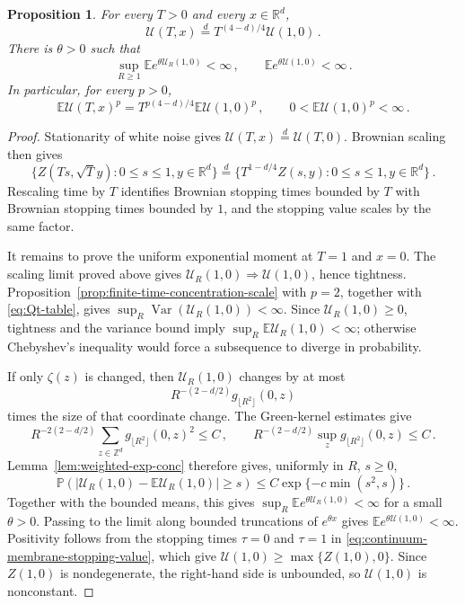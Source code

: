 \documentclass[11pt]{amsart}
\theoremstyle{plain}
\newtheorem{proposition}[theorem]{Proposition}
\theoremstyle{definition}
\newcommand{\Z}{\mathbb{Z}}
\newcommand{\R}{\mathbb{R}}
\newcommand{\E}{\mathbb{E}}
\renewcommand{\P}{\mathbb{P}}
\DeclareMathOperator{\Var}{Var}
\begin{document}
	\begin{proposition}\label{prop:continuum-value-selfsimilar}
		For every $T>0$ and every $x\in\R^d$,
		\[
			\mathcal U(T,x)\stackrel d= T^{(4-d)/4}\mathcal U(1,0)\, .
		\]
			There is $\theta>0$ such that
			\[
				\sup_{R\geq1}\E e^{\theta\mathcal U_R(1,0)}<\infty\, ,
				\qquad
				\E e^{\theta\mathcal U(1,0)}<\infty \, .
			\]
		In particular, for every $p>0$,
		\[
			\E\mathcal U(T,x)^p
			=
			T^{p(4-d)/4}\E\mathcal U(1,0)^p\, ,
			\qquad
			0<\E\mathcal U(1,0)^p<\infty \, .
		\]
	\end{proposition}
	\begin{proof}
		Stationarity of white noise gives
		$\mathcal U(T,x)\stackrel d=\mathcal U(T,0)$. Brownian scaling then gives
		\[
			\{Z(Ts,\sqrt T y):0\leq s\leq1,y\in\R^d\}
			\stackrel d=
			\{T^{1-d/4}Z(s,y):0\leq s\leq1,y\in\R^d\}\, .
		\]
		Rescaling time by $T$ identifies Brownian stopping
		times bounded by $T$ with Brownian stopping times bounded by $1$, and
		the stopping value scales by the same factor.

			It remains to prove the uniform exponential moment at $T=1$ and $x=0$. The
			scaling limit proved above gives
		$\mathcal U_R(1,0)\Longrightarrow\mathcal U(1,0)$, hence tightness.
		Proposition~\ref{prop:finite-time-concentration-scale} with
		$p=2$, together with \eqref{eq:Qt-table}, gives
		$\sup_R\Var(\mathcal U_R(1,0))<\infty$. Since $\mathcal U_R(1,0)\geq0$,
		tightness and the variance bound imply
		$\sup_R\E\mathcal U_R(1,0)<\infty$; otherwise Chebyshev's inequality
		would force a subsequence to diverge in probability.

		If only $\zeta(z)$ is changed, then $\mathcal U_R(1,0)$ changes by at most
		\[
			R^{-(2-d/2)}g_{\lfloor R^2\rfloor}(0,z)
		\]
		times the size of that coordinate change.
		The Green-kernel estimates give
		\[
			R^{-2(2-d/2)}\sum_{z\in\Z^d} g_{\lfloor R^2\rfloor}(0,z)^2\leq C\, ,
			\qquad
			R^{-(2-d/2)}\sup_z g_{\lfloor R^2\rfloor}(0,z)\leq C \, .
		\]
		Lemma~\ref{lem:weighted-exp-conc} therefore gives, uniformly in $R$, $s\geq0$,
		\[
			\P\left(
			|\mathcal U_R(1,0)-\E\mathcal U_R(1,0)|\geq s
			\right)
			\leq C\exp\{-c\min(s^2,s)\} \, .
		\]
		Together with the bounded means, this gives
		$\sup_R\E e^{\theta\mathcal U_R(1,0)}<\infty$ for a small
		$\theta>0$. Passing to the limit along bounded truncations of
		$e^{\theta x}$ gives $\E e^{\theta\mathcal U(1,0)}<\infty$.
		Positivity follows from the stopping times $\tau=0$ and $\tau=1$ in
		\eqref{eq:continuum-membrane-stopping-value}, which give $\mathcal U(1,0)\geq\max\{Z(1,0),0\}$.
		Since $Z(1,0)$ is nondegenerate, the right-hand side is unbounded, so $\mathcal U(1,0)$ is nonconstant.
	\end{proof}
\end{document}
